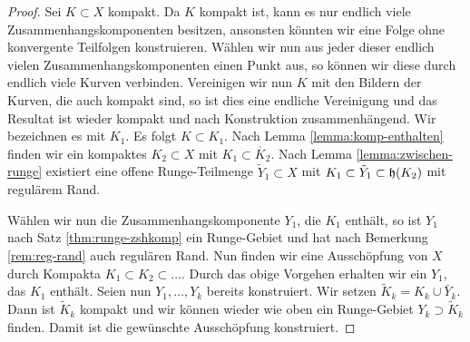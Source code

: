 \begin{proof}
  Sei $K \subset X$ kompakt. Da $K$ kompakt ist, kann es nur endlich
  viele Zusammenhangskomponenten besitzen, ansonsten könnten wir eine
  Folge ohne konvergente Teilfolgen konstruieren. Wählen wir nun aus
  jeder dieser endlich vielen Zusammenhangskomponenten einen Punkt
  aus, so können wir diese durch endlich viele Kurven
  verbinden. Vereinigen wir nun $K$ mit den Bildern der Kurven, die
  auch kompakt sind, so ist dies eine endliche Vereinigung und das
  Resultat ist wieder kompakt und nach Konstruktion
  zusammenhängend. Wir bezeichnen es mit $K_1$. Es folgt $K \subset
  K_1$. Nach Lemma \ref{lemma:komp-enthalten} finden wir ein kompaktes $K_2
  \subset X$ mit $K_1 \subset \mathring{K_2}$. Nach Lemma
  \ref{lemma:zwischen-runge}
  existiert eine offene Runge-Teilmenge $\tilde Y_1 \subset X$ mit
  $K_1 \subset \tilde Y_1 \subset \mathfrak{h}(K_2)$ mit regulärem Rand.
  
  Wählen wir nun die Zusammenhangskomponente $Y_1$, die $K_1$ enthält,
  so ist $Y_1$ nach Satz \ref{thm:runge-zshkomp} ein Runge-Gebiet
  und hat nach Bemerkung \ref{rem:reg-rand} auch regulären Rand.
  Nun finden wir eine Ausschöpfung von $X$ durch Kompakta $K_1 \subset
  K_2 \subset \dots$. 
  Durch das obige Vorgehen erhalten wir ein $Y_1$, das $K_1$
  enthält.
  Seien nun $Y_1, \dots, Y_k$ bereits konstruiert. Wir setzen $\tilde
  K_k = K_k \cup \bar Y_k$. Dann ist $\tilde K_k$ kompakt und wir
  können wieder wie oben ein Runge-Gebiet $Y_k \supset \tilde K_k$
  finden. Damit ist die gewünschte Ausschöpfung konstruiert.
\end{proof}

